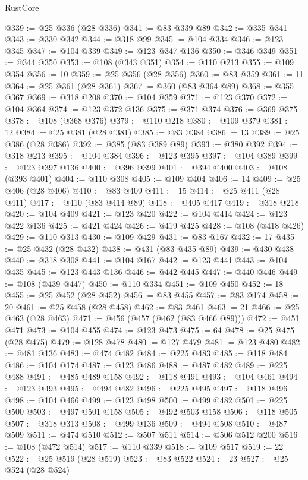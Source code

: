 \begin{lexlean}{RustCore}
\begin{coremodule}
@339 := @25 @336 (@28 @336)
@341 := @83 @339 @89
@342 := @335 @341
@343 := @330 @342
@344 := @318 @99
@345 := @104 @334
@346 := @123 @345
@347 := @104 @339
@349 := @123 @347 @136
@350 := @346 @349
@351 := @344 @350
@353 := @108 (@343 @351)
@354 := @110 @213
@355 := @109 @354
@356 := 10
@359 := @25 @356 (@28 @356)
@360 := @83 @359
@361 := 11
@364 := @25 @361 (@28 @361)
@367 := @360 (@83 @364 @89)
@368 := @355 @367
@369 := @318 @208
@370 := @104 @359
@371 := @123 @370
@372 := @104 @364
@374 := @123 @372 @136
@375 := @371 @374
@376 := @369 @375
@378 := @108 (@368 @376)
@379 := @110 @218
@380 := @109 @379
@381 := 12
@384 := @25 @381 (@28 @381)
@385 := @83 @384
@386 := 13
@389 := @25 @386 (@28 @386)
@392 := @385 (@83 @389 @89)
@393 := @380 @392
@394 := @318 @213
@395 := @104 @384
@396 := @123 @395
@397 := @104 @389
@399 := @123 @397 @136
@400 := @396 @399
@401 := @394 @400
@403 := @108 (@393 @401)
@404 := @110 @308
@405 := @109 @404
@406 := 14
@409 := @25 @406 (@28 @406)
@410 := @83 @409
@411 := 15
@414 := @25 @411 (@28 @411)
@417 := @410 (@83 @414 @89)
@418 := @405 @417
@419 := @318 @218
@420 := @104 @409
@421 := @123 @420
@422 := @104 @414
@424 := @123 @422 @136
@425 := @421 @424
@426 := @419 @425
@428 := @108 (@418 @426)
@429 := @110 @313
@430 := @109 @429
@431 := @83 @167
@432 := 17
@435 := @25 @432 (@28 @432)
@438 := @431 (@83 @435 @89)
@439 := @430 @438
@440 := @318 @308
@441 := @104 @167
@442 := @123 @441
@443 := @104 @435
@445 := @123 @443 @136
@446 := @442 @445
@447 := @440 @446
@449 := @108 (@439 @447)
@450 := @110 @334
@451 := @109 @450
@452 := 18
@455 := @25 @452 (@28 @452)
@456 := @83 @455
@457 := @83 @174
@458 := 20
@461 := @25 @458 (@28 @458)
@462 := @83 @461
@463 := 21
@466 := @25 @463 (@28 @463)
@471 := @456 (@457 (@462 (@83 @466 @89)))
@472 := @451 @471
@473 := @104 @455
@474 := @123 @473
@475 := 64
@478 := @25 @475 (@28 @475)
@479 := @128 @478
@480 := @127 @479
@481 := @123 @480
@482 := @481 @136
@483 := @474 @482
@484 := @225 @483
@485 := @118 @484
@486 := @104 @174
@487 := @123 @486
@488 := @487 @482
@489 := @225 @488
@491 := @485 @489 @158
@492 := @118 @491
@493 := @104 @461
@494 := @123 @493
@495 := @494 @482
@496 := @225 @495
@497 := @118 @496
@498 := @104 @466
@499 := @123 @498
@500 := @499 @482
@501 := @225 @500
@503 := @497 @501 @158
@505 := @492 @503 @158
@506 := @118 @505
@507 := @318 @313
@508 := @499 @136
@509 := @494 @508
@510 := @487 @509
@511 := @474 @510
@512 := @507 @511
@514 := @506 @512 @200
@516 := @108 (@472 @514)
@517 := @110 @339
@518 := @109 @517
@519 := 22
@522 := @25 @519 (@28 @519)
@523 := @83 @522
@524 := 23
@527 := @25 @524 (@28 @524)

\end{coremodule}
\end{lexlean}
